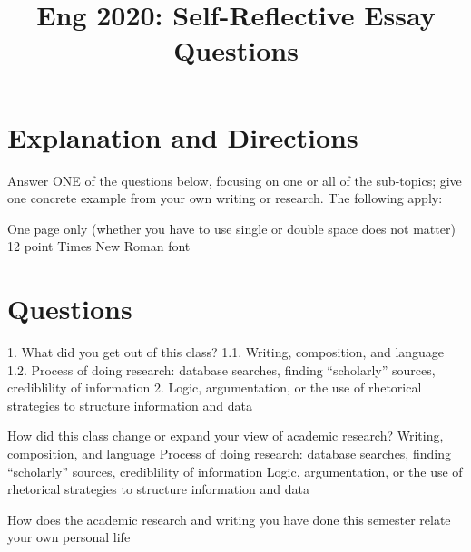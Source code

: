 \documentclass{wpblogentry}
\title{Eng 2020: Self-Reflective Essay Questions}
\begin{document}
\section{Explanation and Directions}
Answer ONE of the questions below, focusing on one or all of the sub-topics; give one concrete example from your own writing or research. The following apply:


 One page only (whether you have to use single or double space does not matter)
 12 point Times New Roman font 


\section{Questions}
1.  What did you get out of this class?
 1.1.  Writing, composition, and language
 1.2. Process of doing research: database searches, finding ``scholarly'' sources, crediblility of information 
2. Logic, argumentation, or the use of rhetorical strategies to structure information and data

 How did this class change or expand your view of academic research?
 Writing, composition, and language
 Process of doing research: database searches, finding ``scholarly'' sources, crediblility of information
 Logic, argumentation, or the use of rhetorical strategies to structure information and data

 How does the academic research and writing you have done this semester relate your own personal life
\end{document}
